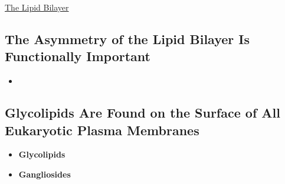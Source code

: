 \documentclass[12pt,letterpaper]{article}
\begin{document}
\begin{secbox}{\hyperlink{10}{The Lipid Bilayer}}
{    \subsection*{The Asymmetry of the Lipid Bilayer Is Functionally Important}
    \begin{itemize}
        \item 
    \end{itemize}
    
    \subsection*{Glycolipids Are Found on the Surface of All Eukaryotic Plasma Membranes}
    \begin{itemize}
        \item \textbf{Glycolipids}
        \item \textbf{Gangliosides}
    \end{itemize}

}\end{secbox}
\hypertarget{10.2}{}
\end{document}
